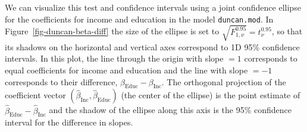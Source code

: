 \documentclass[
  letterpaper,
  10pt,
  krantz2]{krantz}
\makeatletter
\newenvironment{Shaded}{\begin{snugshade}}{\end{snugshade}}
\newcommand{\CommentTok}[1]{\textcolor[rgb]{0.37,0.37,0.37}{#1}}
\newcommand{\DecValTok}[1]{\textcolor[rgb]{0.68,0.00,0.00}{#1}}
\newcommand{\FunctionTok}[1]{\textcolor[rgb]{0.28,0.35,0.67}{#1}}
\newcommand{\NormalTok}[1]{\textcolor[rgb]{0.00,0.23,0.31}{#1}}
\newcommand{\OtherTok}[1]{\textcolor[rgb]{0.00,0.23,0.31}{#1}}
\newcommand{\SpecialCharTok}[1]{\textcolor[rgb]{0.37,0.37,0.37}{#1}}
\newenvironment{kframe}{%
  \medskip{}
  \setlength{\fboxsep}{.8em}
  \def\at@end@of@kframe{}%
  \ifinner\ifhmode%
  \def\at@end@of@kframe{\end{minipage}}%
  \begin{minipage}{\columnwidth}%
  \fi\fi%
  \def\FrameCommand##1{\hskip\@totalleftmargin \hskip-\fboxsep
  \colorbox{shadecolor}{##1}\hskip-\fboxsep
      \hskip-\linewidth \hskip-\@totalleftmargin \hskip\columnwidth}%
  \MakeFramed {\advance\hsize-\width
    \@totalleftmargin\z@ \linewidth\hsize
    \@setminipage}}%
{\par\unskip\endMakeFramed%
  \at@end@of@kframe}
\renewenvironment{Shaded}{\begin{kframe}}{\end{kframe}}
\makeatother
\begin{document}
\begin{Shaded}
\end{Shaded}

We can visualize this test and confidence intervals using a joint
confidence ellipse for the coefficients for income and education in the
model \texttt{duncan.mod}. In Figure~\ref{fig-duncan-beta-diff} the size
of the ellipse is set to \(\sqrt{F^{0.95}_{1,\nu}} = t^{0.95}_{\nu}\),
so that its shadows on the horizontal and vertical axes correspond to 1D
95\% confidence intervals. In this plot, the line through the origin
with slope \(= 1\) corresponds to equal coefficients for income and
education and the line with slope \(= -1\) corresponds to their
difference, \(\beta_{\text{Educ}} - \beta_{\text{Inc}}\). The orthogonal
projection of the coefficient vector
\((\widehat{\beta}_{\text{Inc}}, \widehat{\beta}_{\text{Educ}})\) (the
center of the ellipse) is the point estimate of
\(\widehat{\beta}_{\text{Educ}} - \widehat{\beta}_{\text{Inc}}\) and the
shadow of the ellipse along this axis is the 95\% confidence interval
for the difference in slopes.
\end{document}
